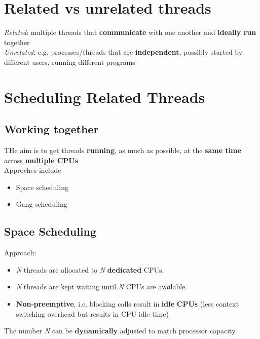 \documentclass{article}
\begin{document}
\section{Related vs unrelated threads}
\begin{flushleft}
\textit{Related}: multiple threads that \textbf{communicate} with one another and \textbf{ideally run} together\\
\textit{Unrelated}: e.g. processes/threads that are \textbf{independent}, possibly started by different users, running different programs
\end{flushleft}

\section{Scheduling Related Threads}

\subsection{Working together}
\begin{flushleft}
THe aim is to get threads \textbf{running}, as much as possible, at the \textbf{same time} across \textbf{multiple CPUs}\\
Approches include
\begin{itemize}
	\item Space scheduling
	\item Gang scheduling
\end{itemize}
\end{flushleft}

\subsection{Space Scheduling}
\begin{flushleft}
Approach:
\begin{itemize}
	\item \textit{N} threads are allocated to \textit{N} \textbf{dedicated} CPUs.
	\item \textit{N} threads are kept waiting until \textit{N} CPUs are available.
	\item \textbf{Non-preemptive}, i.e. blocking calls result in \textbf{idle} \textbf{CPUs} (less context switching overhead but results in CPU idle time)
\end{itemize}
The number \textit{N} can be \textbf{dynamically} adjusted to match processor capacity
\end{flushleft}
\end{document}
